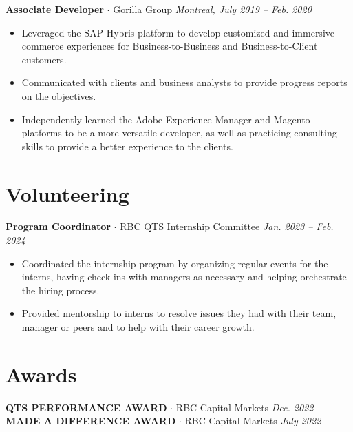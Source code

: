 \documentclass[a4paper,10pt]{article}
\newcommand{\jobentry}[4]{
    \noindent
    \textbf{\large#3}{ $\cdot$ }{#1} \hfill \textit{#2, #4}
    \vspace{-0.5em} %
}
\begin{document}
\jobentry{Gorilla Group}{Montreal}{Associate Developer}{July 2019 – Feb. 2020}
\begin{itemize}[left=0em]
    \item Leveraged the SAP Hybris platform to develop customized and immersive commerce experiences for Business-to-Business and Business-to-Client customers.
    \item Communicated with clients and business analysts to provide progress reports on the objectives.
    \item Independently learned the Adobe Experience Manager and Magento platforms to be a more versatile developer, as well as practicing consulting skills to provide a better experience to the clients.
\end{itemize}
\vspace{-0.3cm}
\section*{Volunteering}
\noindent
\textbf{Program Coordinator}  {$\bm{\cdot}$}  RBC QTS  Internship Committee \hfill \textit{Jan. 2023 – Feb. 2024}
\vspace{-0.5em}
\begin{itemize}[left=0em]
    \item Coordinated the internship program by organizing regular events for the interns, having check-ins with managers as necessary and helping orchestrate the hiring process.
    \item Provided mentorship to interns to resolve issues they had with their team, manager or peers and to help with their career growth.
\end{itemize}
\vspace{-0.3cm}
\section*{Awards}
\noindent
\textbf{QTS PERFORMANCE AWARD} {$\bm{\cdot}$} RBC Capital Markets \hfill \textit{Dec. 2022} \\
\textbf{MADE A DIFFERENCE AWARD} {$\bm{\cdot}$} RBC Capital Markets \hfill \textit{July 2022} \\
\end{document}
